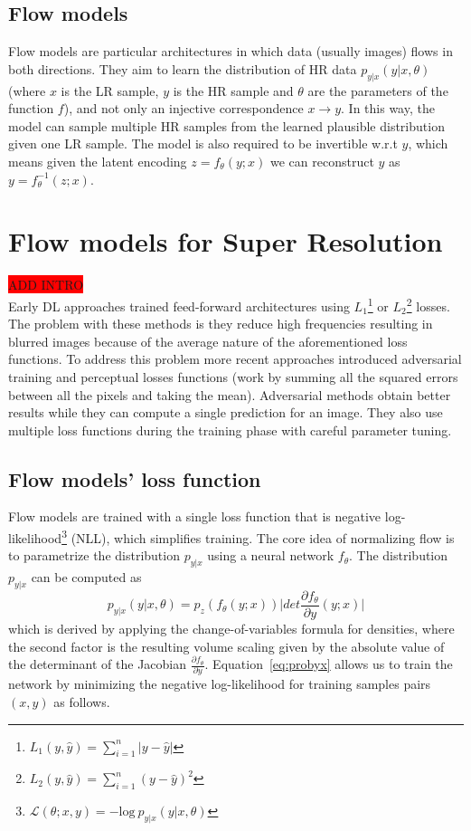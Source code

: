 \documentclass{article}
\begin{document}
\subsection{Flow models}
Flow models are particular architectures in which data (usually images) flows in both directions. They aim to learn the distribution of HR data $p_{y|x}(y|x, \theta)$ (where $x$ is the LR sample, $y$ is the HR sample and $\theta$ are the parameters of the function $f$), and not only an injective correspondence $x \rightarrow y$. In this way, the model can sample multiple HR samples from the learned plausible distribution given one LR sample. The model is also required to be invertible w.r.t $y$, which means given the latent encoding $z = f_{\theta}(y;x)$ we can reconstruct $y$ as $y = f_{\theta}^{-1}(z;x)$. 




\section{Flow models for Super Resolution}\label{sec:model}
\colorbox{red}{ADD INTRO} \\
Early DL approaches trained feed-forward architectures using $L_1$\footnote{$L_1(y,\hat{y}) = \sum^n_{i=1} |y-\hat{y}|$} or $L_2$\footnote{$L_2(y,\hat{y}) = \sum^n_{i=1} (y-\hat{y})^2$} losses. The problem with these methods is they reduce high frequencies resulting in blurred images because of the average nature of the aforementioned loss functions. To address this problem more recent approaches introduced adversarial training and perceptual losses functions (work by summing all the squared errors between all the pixels and taking the mean). Adversarial methods obtain better results while they can compute a single prediction for an image. They also use multiple loss functions during the training phase with careful parameter tuning.

\subsection{Flow models' loss function}
Flow models are trained with a single loss function that is negative log-likelihood\footnote{$\mathcal{L}(\theta; x, y) = - \text{log}\:p_{y|x}(y|x, \theta)$} (NLL), which simplifies training. The core idea of normalizing flow is to parametrize the distribution $p_{y|x}$ using a neural network $f_\theta$.  The distribution $p_{y|x}$ can be computed as
\begin{equation}
    \label{eq:probyx}
    p_{y|x}(y|x,\theta) = p_z (f_{\theta}(y;x))  \bigg | det \frac{\partial f_{\theta}}{\partial y}(y;x) \bigg |
\end{equation}
which is derived by applying the change-of-variables formula for densities, where the second factor is the resulting volume scaling given by the absolute value of the determinant of the Jacobian $\frac{\partial f_{\theta}}{\partial y}$. Equation~\ref{eq:probyx} allows us to train the network by minimizing the negative log-likelihood for training samples pairs $(x, y)$ as follows.
\end{document}
